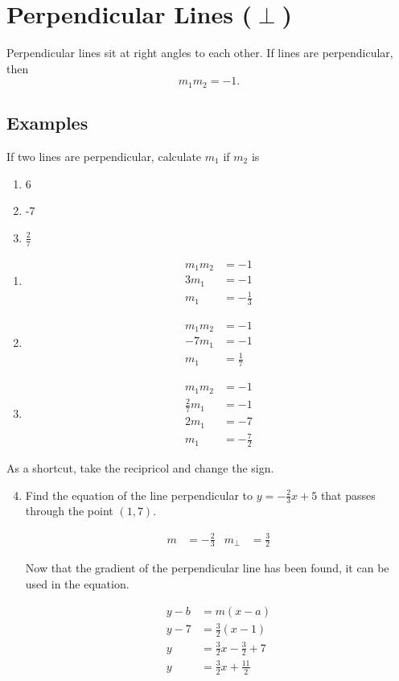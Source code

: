 \section{Perpendicular Lines ($\perp$)}
Perpendicular lines sit at right angles to each other. If lines are perpendicular, then
\begin{equation}
m_1 m_2 = -1.
\end{equation}

\subsection{Examples}
If two lines are perpendicular, calculate $m_1$ if $m_2$ is
\begin{enumerate}
	\item 6
	\item -7
	\item $\frac{2}{7}$
\end{enumerate}

\begin{enumerate}
	\item
	\begin{align*}
	m_1 m_2 &= -1\\
	3m_1 &= -1\\
	m_1&=-\frac{1}{3}
	\end{align*}
	
	\item
	\begin{align*}
	m_1 m_2 &= -1\\
	-7m_1 &= -1\\
	m_1&=\frac{1}{7}
	\end{align*}
	
	\item
	\begin{align*}
	m_1 m_2 &= -1\\
	\frac{2}{7}m_1 &= -1\\
	2m_1&=-7\\
	m_1&=-\frac{7}{2}
	\end{align*}
\end{enumerate}

As a shortcut, take the recipricol and change the sign.

\begin{enumerate}
	\setcounter{enumi}{3}
	\item
	Find the equation of the line perpendicular to $y=-\frac{2}{3}x+5$ that passes through the point $\left(1,7\right)$.

	\begin{align*}
		m &= -\frac{2}{3} & m_\perp &= \frac{3}{2}
	\end{align*}

	Now that the gradient of the perpendicular line has been found, it can be used in the equation.
	
	\begin{align*}
		y-b&=m(x-a)\\
		y-7&=\frac{3}{2}(x-1)\\
		y&=\frac{3}{2}x - \frac{3}{2} + 7\\
		y&=\frac{3}{2}x + \frac{11}{2}
	\end{align*}
\end{enumerate}


